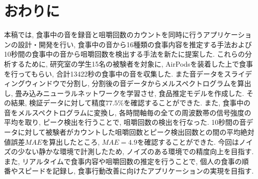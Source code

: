 
\chapter{おわりに}
\label{cha:conclu}

本稿では, 食事中の音を録音と咀嚼回数のカウントを同時に行うアプリケーションの設計・開発を行い, 食事中の音から16種類の食事内容を推定する手法および10秒間の食事中の音から咀嚼回数を検出する手法を新たに提案した. これらの分析するために, 研究室の学生15名の被験者を対象に, AirPodsを装着した上で食事を行ってもらい, 合計13422秒の食事中の音を収集した. また音データをスライディングウィンドウで分割し, 分割後の音データからメルスペクトログラムを算出し, 畳み込みニューラルネットワークを学習させ, 食品推定モデルを作成した. その結果, 検証データに対して精度$77.5\%$を確認することができた. また, 食事中の音をメルスペクトログラムに変換し, 各時間軸毎の全ての周波数帯の信号強度の平均を取り, ピーク検出を行うことで, 咀嚼回数の検出を行なった. 10秒間の音データに対して被験者がカウントした咀嚼回数とピーク検出回数との間の平均絶対値誤差$MAE$を算出したところ, $MAE = 4.9$を確認することができた. 今回はノイズの少ない静かな環境で計測したため, ノイズのある環境での精度向上を目指す. また, リアルタイムで食事内容や咀嚼回数の推定を行うことで, 個人の食事の順番やスピードを記録し, 食事行動改善に向けたアプリケーションの実現を目指す.


